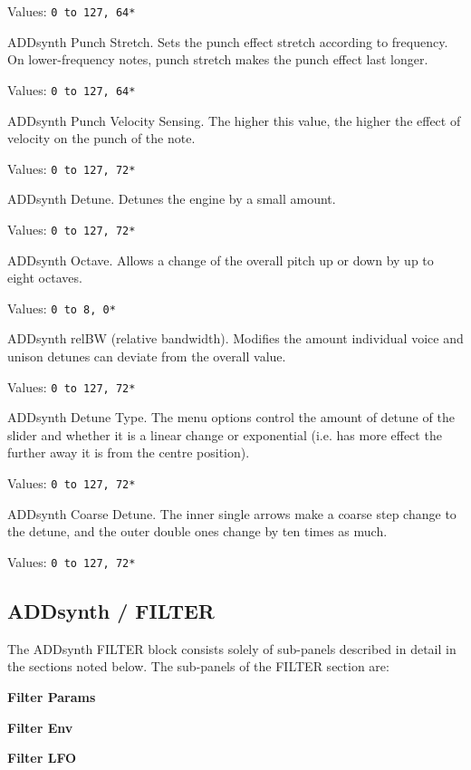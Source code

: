    Values: \texttt{0 to 127, 64*}

   ADDsynth Punch Stretch.
   Sets the punch effect stretch according to frequency. On lower-frequency
   notes, punch stretch makes the punch effect last longer.

   Values: \texttt{0 to 127, 64*}

   ADDsynth Punch Velocity Sensing.
   The higher this value, the higher the effect of velocity on the punch of
   the note.

   Values: \texttt{0 to 127, 72*}

   ADDsynth Detune.
   Detunes the engine by a small amount.

   Values: \texttt{0 to 127, 72*}

   ADDsynth Octave.
   Allows a change of the overall pitch up or down by up to eight octaves.

   Values: \texttt{0 to 8, 0*}

   ADDsynth relBW (relative bandwidth).
   Modifies the amount individual voice and unison detunes can deviate
   from the overall value.

   Values: \texttt{0 to 127, 72*}

   ADDsynth Detune Type.
   The menu options control the amount of detune of the slider and whether it is a
   linear change or exponential (i.e. has more effect the further away it is from
   the centre position).

   Values: \texttt{0 to 127, 72*}

   ADDsynth Coarse Detune.
   The inner single arrows make a coarse step change to the detune, and the outer
   double ones change by ten times as much.

   Values: \texttt{0 to 127, 72*}

\subsection{ADDsynth / FILTER}
\label{subsec:addsynth_filter}

   The ADDsynth FILTER block consists solely of sub-panels
   described in detail in the sections noted below.  The
   sub-panels of the FILTER section are:

   \begin{enumber}
      \item \textbf{Filter Params}
      \item \textbf{Filter Env}
      \item \textbf{Filter LFO}
   \end{enumber}

